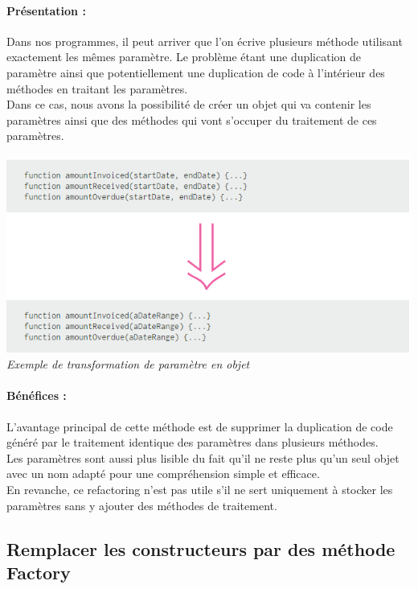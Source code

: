 \documentclass[a4paper,twoside,12pt,openright]{report}
\begin{document}
\paragraph{Présentation :}
Dans nos programmes, il peut arriver que l'on écrive plusieurs méthode utilisant exactement les mêmes paramètre. Le problème étant une duplication de paramètre ainsi que potentiellement une duplication de code à l'intérieur des méthodes en traitant les paramètres.\\
Dans ce cas, nous avons la possibilité de créer un objet qui va contenir les paramètres ainsi que des méthodes qui vont s'occuper du traitement de ces paramètres.\\

\begin{center}
\includegraphics[scale=1]{Image/Ajout_Objet_Parametre.png}\\
\itshape{Exemple de transformation de paramètre en objet \cite{ref8}}
\end{center}

\paragraph{Bénéfices :}
L'avantage principal de cette méthode est de supprimer la duplication de code généré par le traitement identique des paramètres dans plusieurs méthodes.\\
Les paramètres sont aussi plus lisible du fait qu'il ne reste plus qu'un seul objet avec un nom adapté pour une compréhension simple et efficace.\\
En revanche, ce refactoring n'est pas utile s'il ne sert uniquement à stocker les paramètres sans y ajouter des méthodes de traitement.\\

\subsection{Remplacer les constructeurs par des méthode Factory}
\end{document}
